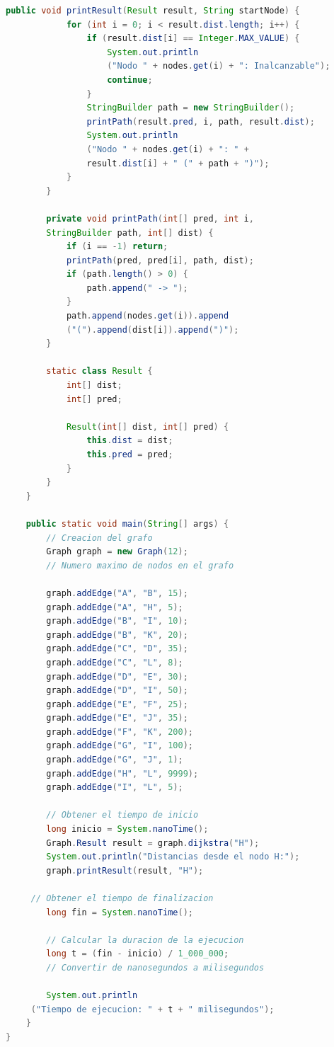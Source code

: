 \begin{lstlisting}[language=Java, style=ColorStyle]
        public void printResult(Result result, String startNode) {
            for (int i = 0; i < result.dist.length; i++) {
                if (result.dist[i] == Integer.MAX_VALUE) {
                    System.out.println
                    ("Nodo " + nodes.get(i) + ": Inalcanzable");
                    continue;
                }
                StringBuilder path = new StringBuilder();
                printPath(result.pred, i, path, result.dist);
                System.out.println
                ("Nodo " + nodes.get(i) + ": " + 
                result.dist[i] + " (" + path + ")");
            }
        }

        private void printPath(int[] pred, int i, 
        StringBuilder path, int[] dist) {
            if (i == -1) return;
            printPath(pred, pred[i], path, dist);
            if (path.length() > 0) {
                path.append(" -> ");
            }
            path.append(nodes.get(i)).append
            ("(").append(dist[i]).append(")");
        }

        static class Result {
            int[] dist;
            int[] pred;

            Result(int[] dist, int[] pred) {
                this.dist = dist;
                this.pred = pred;
            }
        }
    }

    public static void main(String[] args) {
        // Creacion del grafo
        Graph graph = new Graph(12); 
        // Numero maximo de nodos en el grafo

        graph.addEdge("A", "B", 15);
        graph.addEdge("A", "H", 5);
        graph.addEdge("B", "I", 10);
        graph.addEdge("B", "K", 20);
        graph.addEdge("C", "D", 35);
        graph.addEdge("C", "L", 8);
        graph.addEdge("D", "E", 30);
        graph.addEdge("D", "I", 50);
        graph.addEdge("E", "F", 25);
        graph.addEdge("E", "J", 35);
        graph.addEdge("F", "K", 200);
        graph.addEdge("G", "I", 100);
        graph.addEdge("G", "J", 1);
        graph.addEdge("H", "L", 9999);
        graph.addEdge("I", "L", 5);

        // Obtener el tiempo de inicio
	    long inicio = System.nanoTime();
        Graph.Result result = graph.dijkstra("H");
        System.out.println("Distancias desde el nodo H:");
        graph.printResult(result, "H");
        
     // Obtener el tiempo de finalizacion
	    long fin = System.nanoTime();
	      
	    // Calcular la duracion de la ejecucion
	    long t = (fin - inicio) / 1_000_000; 
	    // Convertir de nanosegundos a milisegundos
	      
	    System.out.println
     ("Tiempo de ejecucion: " + t + " milisegundos");
    }
}

	\end{lstlisting}

